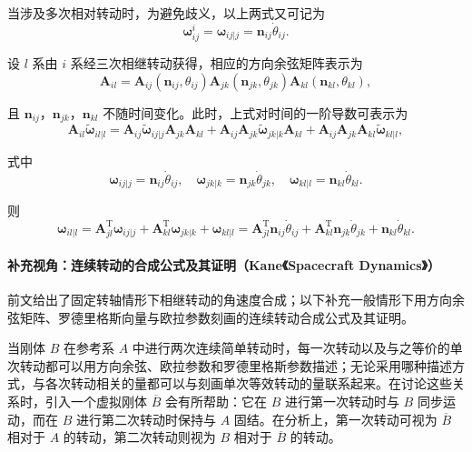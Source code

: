 当涉及多次相对转动时，为避免歧义，以上两式又可记为
\begin{equation}
    \bm{\omega}_{ij}^i = \bm{\omega}_{ij|j} = \bm{n}_{ij}\dot{\theta}_{ij}.
\end{equation}

设 $l$ 系由 $i$ 系经三次相继转动获得，相应的方向余弦矩阵表示为
\begin{equation}
    \bm{A}_{il} = \bm{A}_{ij}(\bm{n}_{ij}, \theta_{ij})\bm{A}_{jk}(\bm{n}_{jk}, \theta_{jk})\bm{A}_{kl}(\bm{n}_{kl}, \theta_{kl}),
\end{equation}

且 $\bm{n}_{ij}$，$\bm{n}_{jk}$，$\bm{n}_{kl}$ 不随时间变化。此时，上式对时间的一阶导数可表示为
\begin{equation}
    \bm{A}_{il}\tilde{\bm{\omega}}_{il|l} = \bm{A}_{ij}\tilde{\bm{\omega}}_{ij|j}\bm{A}_{jk}\bm{A}_{kl} + \bm{A}_{ij}\bm{A}_{jk}\tilde{\bm{\omega}}_{jk|k}\bm{A}_{kl} + \bm{A}_{ij}\bm{A}_{jk}\bm{A}_{kl}\tilde{\bm{\omega}}_{kl|l},
\end{equation}

式中
\begin{equation}
    \bm{\omega}_{ij|j} = \bm{n}_{ij}\dot{\theta}_{ij},\quad \bm{\omega}_{jk|k} = \bm{n}_{jk}\dot{\theta}_{jk},\quad \bm{\omega}_{kl|l} = \bm{n}_{kl}\dot{\theta}_{kl}.
\end{equation}

则
\begin{equation}
    \bm{\omega}_{il|l} = \bm{A}_{jl}^{\mathrm{T}}\bm{\omega}_{ij|j} + \bm{A}_{kl}^{\mathrm{T}}\bm{\omega}_{jk|k} + \bm{\omega}_{kl|l} = \bm{A}_{jl}^{\mathrm{T}}\bm{n}_{ij}\dot{\theta}_{ij} + \bm{A}_{kl}^{\mathrm{T}}\bm{n}_{jk}\dot{\theta}_{jk} + \bm{n}_{kl}\dot{\theta}_{kl}.
\end{equation}
%
\paragraph*{补充视角：连续转动的合成公式及其证明（Kane《Spacecraft Dynamics》）}

前文给出了固定转轴情形下相继转动的角速度合成；以下补充一般情形下用方向余弦矩阵、罗德里格斯向量与欧拉参数刻画的连续转动合成公式及其证明。


当刚体 $B$ 在参考系 $A$ 中进行两次连续简单转动时，每一次转动以及与之等价的单次转动都可以用方向余弦、欧拉参数和罗德里格斯参数描述；无论采用哪种描述方式，与各次转动相关的量都可以与刻画单次等效转动的量联系起来。在讨论这些关系时，引入一个虚拟刚体 $\overline{B}$ 会有所帮助：它在 $B$ 进行第一次转动时与 $B$ 同步运动，而在 $B$ 进行第二次转动时保持与 $A$ 固结。在分析上，第一次转动可视为 $\overline{B}$ 相对于 $A$ 的转动，第二次转动则视为 $B$ 相对于 $\overline{B}$ 的转动。

